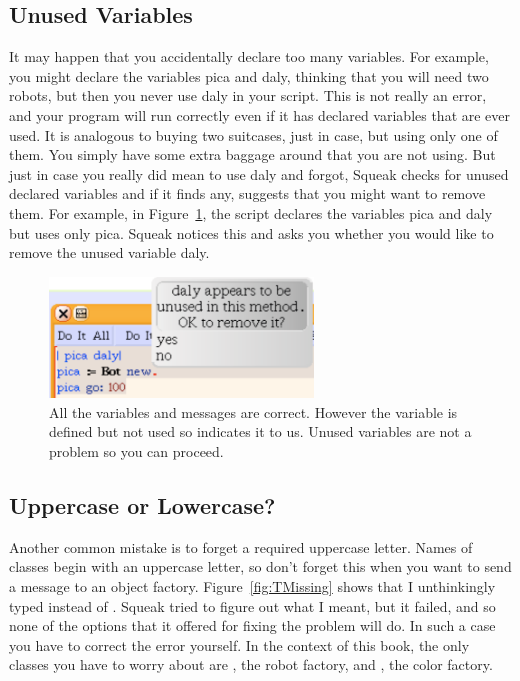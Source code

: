 \documentclass[a4paper,10pt,twoside]{book}
\begin{document}
\subsection{Unused Variables}

It may happen that you accidentally declare too many variables. For example, you might 
declare the variables pica and daly, thinking that you will need two robots, but then you never 
use daly in your script. This is not really an error, and your program will run correctly even if it 
has declared variables that are ever used. It is analogous to buying two suitcases, just in case, 
but using only one of them. You simply have some extra baggage around that you are not 
using. But just in case you really did mean to use daly and forgot, Squeak checks for unused 
declared variables and if it finds any, suggests that you might want to remove them. For example, in Figure~\ref{fig:unusedVariables}, the script declares the variables pica and daly but uses only pica. Squeak 
notices this and asks you whether you would like to remove the unused variable daly. 

\begin{figure}[h]
\begin{center}\includegraphics[width=7cm]{unusedVariables}
\caption{All the variables and messages are correct. However the variable  is  defined but not used so \sq indicates it to us. Unused variables are not a problem so you can proceed.\label{fig:unusedVariables}}\end{center}
\end{figure}

\subsection{Uppercase or Lowercase?}

Another common mistake is to forget a required uppercase letter. Names of classes begin with 
an uppercase letter, so don’t forget this when you want to send a message to an object factory. 
Figure~\ref{fig:TMissing} shows that I unthinkingly typed  instead of . Squeak tried to figure out what I meant, but it failed, and so none of the options that it offered for fixing the problem will do. In 
such a case you have to correct the error yourself. In the context of this book, the only classes 
you have to worry about are , the robot factory, and , the color factory.
\end{document}
